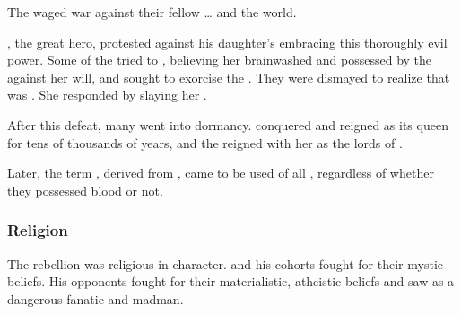 The \firstgendragons{} waged war against their fellow \ophidians{}\ldots{} and the world.

\HesodNerga{}, the great \ophidian{} hero, protested against his daughter's embracing this thoroughly evil power. 
Some of the \ophidians{} tried to  \Tiamat, believing her brainwashed and possessed by the \xzaishanns{} against her will, and sought to exorcise the \daemons. 
They were dismayed to realize that \Tiamat{} was . 
She responded by slaying her \HesodNerga. 

After this defeat, many \ophidians{} went into dormancy. 
\Tiamat{} conquered \Miith{} and reigned as its queen for tens of thousands of years, and the \dragons{} reigned with her as the lords of \Miith{}. 

Later, the term \quo\dragon, derived from \quo\draecchonosh, came to be used of all \ophidians, regardless of whether they possessed \xzaishannic{} blood or not. 







\subsubsection{Religion}
The rebellion was religious in character. 
\Sethicus and his cohorts fought for their mystic beliefs.
His opponents fought for their materialistic, atheistic beliefs and saw \Sethicus as a dangerous fanatic and madman. 

